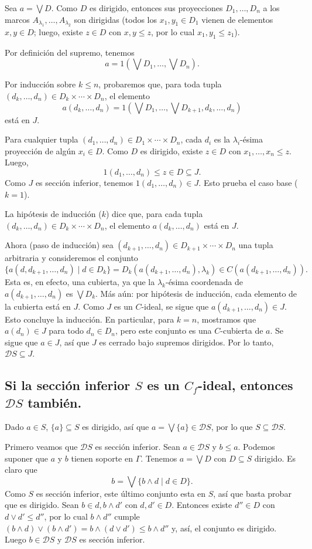 \documentclass[12pt,letterpaper,titlepage]{article}
\theoremstyle{definition}
\renewcommand\sup{\vee}
\newcommand\Sup{\bigvee}
\renewcommand\inf{\wedge}
\newcommand\D{\mathcal D}
\newcommand\tps[2]{\texorpdfstring{#1}{#2}}
\newcommand\<{\langle}
\renewcommand\>{\rangle}
\begin{document}
Sea $a=\Sup D$.
Como $D$ es dirigido, entonces sus proyecciones $D_1,\dots,D_n$ a
los marcos $A_{\lambda_1},\dots,A_{\lambda_2}$ son dirigidas
(todos los $x_1,y_1\in D_1$ vienen de elementos $x,y\in D$;
luego, existe $z\in D$ con $x,y\leq z$, por lo cual $x_1,y_1\leq
z_1$).

Por definición del supremo, tenemos
\[
  a = 1(\Sup D_1,\dots,\Sup D_n)
.\]

Por inducción sobre $k\leq n$, probaremos que, para toda tupla
$(d_k,\dots,d_n)\in D_k\times\cdots\times D_n$, el elemento
\[
  a(d_k,\dots,d_n)
  =
  1(\Sup D_1,\dots,\Sup D_{k+1},d_k,\dots,d_n)
\]
está en $J$.

Para cualquier tupla $(d_1,\dots,d_n)\in D_1\times\cdots\times
D_n$, cada $d_i$ es la $\lambda_i$-ésima
proyección de algún $x_i\in D$.
Como $D$ es dirigido, existe $z\in D$ con $x_1,\dots,x_n\leq z$.
Luego,
\[
  1(d_1,\dots,d_n)\leq z\in D \subseteq J
.\]
Como $J$ es sección inferior, tenemos $1(d_1,\dots,d_n)\in J$.
Esto prueba el caso base ($k=1$).

La hipótesis de inducción ($k$) dice que, para cada tupla
$(d_k,\dots,d_n)\in D_k\times\cdots\times D_n$, el elemento
$a(d_k,\dots,d_n)$ está en $J$.

Ahora (paso de inducción) sea
$(d_{k+1},\dots,d_n)\in D_{k+1}\times\cdots\times D_n$ una tupla
arbitraria y consideremos el conjunto
\
\[
  \{a(d,d_{k+1},\dots,d_n) \mid d\in D_k\}
  =
  D_k(a(d_{k+1},\dots,d_n),\lambda_k)
  \in
  C(a(d_{k+1},\dots,d_n))
.\]
Esta es, en efecto, una cubierta, ya que la $\lambda_k$-ésima
coordenada de $a(d_{k+1},\dots,d_n)$ es $\Sup D_k$.
Más aún: por hipótesis de inducción, cada elemento de la cubierta
está en $J$.
Como $J$ es un $C$-ideal, se sigue que
$a(d_{k+1},\dots,d_n)\in J$.
Esto concluye la inducción.
En particular, para $k=n$, mostramos que $a(d_n)\in J$ para todo
$d_n\in D_n$, pero este conjunto es una $C$-cubierta de $a$.
Se sigue que $a\in J$, así que $J$ es cerrado bajo supremos
dirigidos.
Por lo tanto, $\D S\subseteq J$.

\subsection{Si la sección inferior \tps{$S$}{S} es un \tps{$C_f$}{Cf}-ideal,
entonces \tps{$\D S$}{DS} también.}

Dado $a\in S$, $\{a\}\subseteq S$ es dirigido, así que
$a=\Sup\{a\}\in \D S$, por lo que $S\subseteq\D S$.

Primero veamos que $\D S$ es sección inferior.
Sean $a\in \D S$ y $b\leq a$.
Podemos suponer que $a$ y $b$ tienen soporte en $\Gamma$.
Tenemos $a=\Sup D$ con $D\subseteq S$ dirigido.
Es claro que
\[
  b = \Sup\{b\inf d\mid d\in D\}
.\]
Como $S$ es sección inferior, este último conjunto esta en $S$,
así que basta probar que es dirigido.
Sean $b\in d,b\inf d'$ con $d,d'\in D$.
Entonces existe $d''\in D$ con $d\sup d'\leq d''$, por lo
cual $b\inf d''$ cumple
$(b\inf d)\sup(b\inf d')=b\inf(d\sup d')\leq b\inf d''$ y, así,
el conjunto es dirigido.
Luego $b\in\D S$ y $\D S$ es sección inferior.
\end{document}
